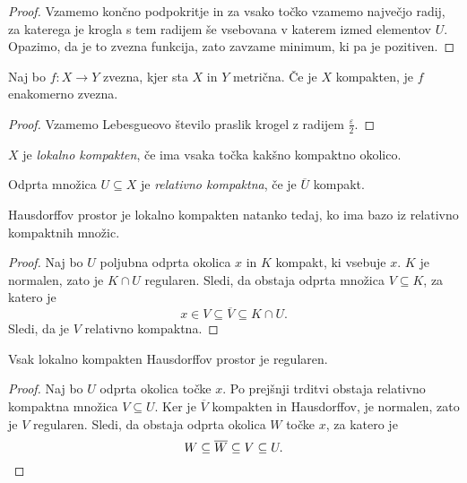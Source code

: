 \begin{proof}
Vzamemo končno podpokritje in za vsako točko vzamemo največjo
radij, za katerega je krogla s tem radijem še vsebovana v katerem
izmed elementov $U$. Opazimo, da je to zvezna funkcija, zato
zavzame minimum, ki pa je pozitiven.
\end{proof}

\begin{posledica}
Naj bo $f \colon X \to Y$ zvezna, kjer sta $X$ in $Y$ metrična. Če
je $X$ kompakten, je $f$ enakomerno zvezna.
\end{posledica}

\begin{proof}
Vzamemo Lebesgueovo število praslik krogel z radijem
$\frac{\varepsilon}{2}$.
\end{proof}

\begin{definicija}
$X$ je
\emph{lokalno kompakten},
če ima vsaka točka kakšno kompaktno okolico.
\end{definicija}

\begin{definicija}
Odprta množica $U \subseteq X$ je \emph{relativno kompaktna}, če je
$\overline{U}$ kompakt.
\end{definicija}

\begin{trditev}
Hausdorffov prostor je lokalno kompakten natanko tedaj, ko ima bazo
iz relativno kompaktnih množic.
\end{trditev}

\begin{proof}
Naj bo $U$ poljubna odprta okolica $x$ in $K$ kompakt, ki vsebuje
$x$. $K$ je normalen, zato je $K \cap U$ regularen. Sledi, da
obstaja odprta množica $V \subseteq K$, za katero je
\[
x \in V \subseteq \overline{V} \subseteq K \cap U.
\]
Sledi, da je $V$ relativno kompaktna.
\end{proof}

\begin{izrek}
Vsak lokalno kompakten Hausdorffov prostor je regularen.
\end{izrek}

\begin{proof}
Naj bo $U$ odprta okolica točke $x$. Po prejšnji trditvi obstaja
relativno kompaktna množica $V \subseteq U$. Ker je $\overline{V}$
kompakten in Hausdorffov, je normalen, zato je $V$ regularen.
Sledi, da obstaja odprta okolica $W$ točke $x$, za katero je
\[
W \subseteq \overline{W} \subseteq V \subseteq U. \qedhere
\]
\end{proof}

